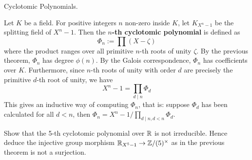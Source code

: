 \documentclass[../book.tex]{subfiles}
\begin{document}
\begin{dfn} Cyclotomic Polynomials.
    
    Let $K$ be a field. For positive integers $n$ non-zero inside $K$,
    let $K_{X^n - 1}$ be the splitting field of $X^n - 1$.
    Then the \textbf{$n$-th cyclotomic polynomial} is defined as \[
        \Phi_n := \prod (X - \zeta)
    \]
    where the product ranges over all primitive $n$-th roots of unity $\zeta$.
    By the previous theorem, $\Phi_n$ has degree $\phi(n)$.
    By the Galois correspondence, $\Phi_n$ has coefficients over $K$. 
    Furthermore, since $n$-th roots of unity with order $d$ 
    are precisely the primitive $d$-th root of unity, we have
    \[
        X^n - 1 = \prod_{d \mid n} \Phi_d
    \]
    This gives an inductive way of computing $\Phi_n$, that is: 
    suppose $\Phi_d$ has been calculated for all $d < n$,
    then $\Phi_n = X^n - 1 / \prod_{d \mid n, d < n} \Phi_d$. 
    
\end{dfn}
\begin{ex} 
    
    Show that the 5-th cyclotomic polynomial over $\mathbb{R}$ is not irreducible.
    Hence deduce the injective group morphism $\mathbb{R}_{X^5 - 1} \to \mathbb{Z}/(5)^\times$
    as in the previous theorem is not a surjection. 
    
\end{ex}
\end{document}
